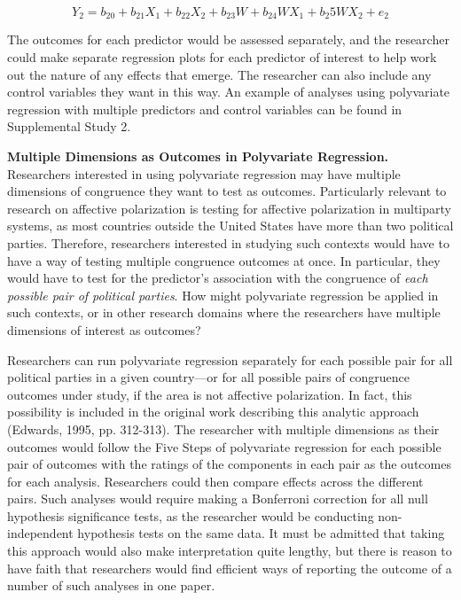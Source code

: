 \documentclass[authordate, meta]{jote-new-article}
\begin{document}
	\begin{equation}
		Y_2= b_{20}+b_{21}X_1+b_{22}X_2+b_{23}W+b_{24}WX_1+b_{2}5WX_2+e_2
	\end{equation}



	The outcomes for each predictor would be assessed separately, and the researcher could make separate regression plots for each predictor of interest to help work out the nature of any effects that emerge. The researcher can also include any control variables they want in this way. An example of analyses using polyvariate regression with multiple predictors and control variables can be found in Supplemental Study 2.



	\textbf{Multiple Dimensions as Outcomes in Polyvariate Regression. }Researchers interested in using polyvariate regression may have multiple dimensions of congruence they want to test as outcomes. Particularly relevant to research on affective polarization is testing for affective polarization in multiparty systems, as most countries outside the United States have more than two political parties. Therefore, researchers interested in studying such contexts would have to have a way of testing multiple congruence outcomes at once. In particular, they would have to test for the predictor's association with the congruence of \emph{each possible pair of political parties}. How might polyvariate regression be applied in such contexts, or in other research domains where the researchers have multiple dimensions of interest as outcomes?



	Researchers can run polyvariate regression separately for each possible pair for all political parties in a given country—or for all possible pairs of congruence outcomes under study, if the area is not affective polarization. In fact, this possibility is included in the original work describing this analytic approach (Edwards, 1995, pp. 312-313). The researcher with multiple dimensions as their outcomes would follow the Five Steps of polyvariate regression for each possible pair of outcomes with the ratings of the components in each pair as the outcomes for each analysis. Researchers could then compare effects across the different pairs. Such analyses would require making a Bonferroni correction for all null hypothesis significance tests, as the researcher would be conducting non-independent hypothesis tests on the same data. It must be admitted that taking this approach would also make interpretation quite lengthy, but there is reason to have faith that researchers would find efficient ways of reporting the outcome of a number of such analyses in one paper.
\end{document}
